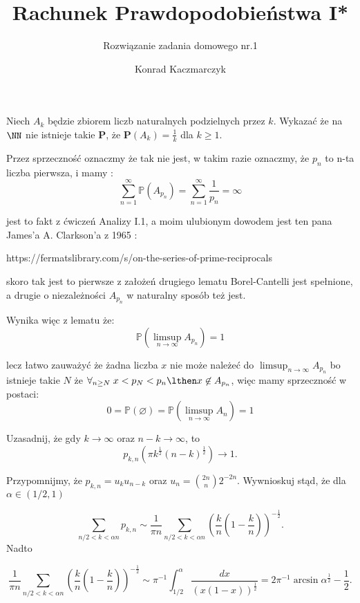 \documentclass[11pt]{scrartcl}
\author{Konrad Kaczmarczyk}
\begin{document}
    \title{Rachunek Prawdopodobieństwa I*}
    \subtitle{Rozwiązanie zadania domowego nr.1}
    \maketitle
    \begin{zadanie*}
        Niech $A_k$ będzie zbiorem liczb naturalnych podzielnych przez $k$. 
        Wykazać że na $\NN$ nie istnieje takie \textbf{P}, że 
        $\textbf{P} \left ( A_k \right ) = \frac{1}{k}$ dla $k \geq 1$.  
    \end{zadanie*}

    Przez sprzeczność oznaczmy że tak nie jest, w takim razie oznaczmy, 
    że $p_n$ to n-ta liczba pierwsza, i mamy :
    \[
    \sum_{n=1}^{\infty } \mathbb{P}(A_{p_n}) = \sum_{n=1}^{\infty }  \frac{1}{p_n} = \infty   
    \]

    jest to fakt z ćwiczeń Analizy I.1, a moim ulubionym dowodem jest ten 
    pana James'a  A. Clarkson'a z 1965 :

    https://fermatslibrary.com/s/on-the-series-of-prime-reciprocals

    \vspace{10px}
    
    skoro tak jest to pierwsze z założeń drugiego lematu Borel-Cantelli jest spełnione, 
    a drugie o niezależności $A_{p_n}$ w naturalny sposób też jest.

    Wynika więc z lematu że:
    \[
        \mathbb{P} \left ( \limsup_{n \to \infty } A_{p_n} \right ) = 1
    \]

    lecz łatwo zauważyć że żadna liczba $x$ nie może należeć do 
    $\limsup_{n \to \infty } A_{p_n}$ bo istnieje takie $N$ że 
    $\forall_{n \geq N} \; x < p_N < p_n \lthen x \not \in A_{p_n}$, 
    więc mamy sprzeczność w postaci:
    \[
        0 = \mathbb{P} \left ( \varnothing \right ) = 
        \mathbb{P} \left ( \limsup_{n \to \infty } A_n \right ) 
        = 1
    \]

    \newpage

    \begin{zadanie*}
        Uzasadnij, że gdy \( k \to \infty \) oraz \( n - k \to \infty \), to
        \[
            p_{k,n} (\pi k^{\frac{1}{2}} (n - k)^{\frac{1}{2}}) \to 1.
        \]

        Przypomnijmy, że \( p_{k,n} = u_k u_{n-k} \) oraz \( u_n = \binom{2n}{n} 2^{-2n} \). 
        Wywnioskuj stąd, że dla \( \alpha \in (1/2, 1) \)

        \[
            \sum_{n/2 < k < \alpha n} p_{k,n} \sim 
            \frac{1}{\pi n} \sum_{n/2 < k < \alpha n} 
                \left( \frac{k}{n} (1 - \frac{k}{n}) \right)^{-\frac{1}{2}}.
        \]
        Nadto

        \[
            \frac{1}{\pi n} \sum_{n/2 < k < \alpha n} 
                \left( \frac{k}{n} (1 - \frac{k}{n}) \right)^{-\frac{1}{2}} \sim 
            \pi^{-1} \int_{1/2}^{\alpha} \frac{dx}{(x(1-x))^{\frac{1}{2}}} = 
            2 \pi^{-1} \arcsin \alpha^{\frac{1}{2}} - \frac{1}{2}.
        \]
    \end{zadanie*}
\end{document}
